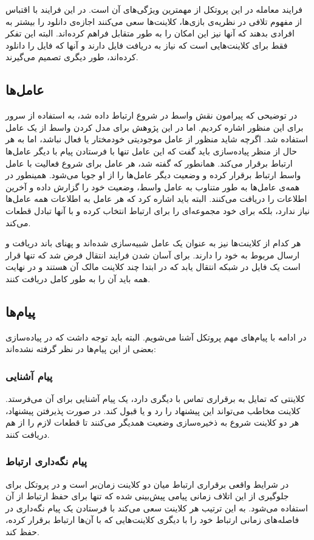 \documentclass{article}
\begin{document}
فرایند معامله در این پروتکل از مهمترین ویژگی‌های آن است. در این فرایند با اقتباس از مفهوم تلافی در نظریه‌ی بازی‌ها، کلاینت‌ها سعی می‌کنند اجازه‌ی دانلود را بیشتر به افرادی بدهند که آنها نیز این امکان را به طور متقابل فراهم کرده‌اند. البته این تفکر فقط برای کلاینت‌هایی است که نیاز به دریافت فایل دارند و آنها که فایل را دانلود کرده‌اند، طور دیگری تصمیم می‌گیرند.

\subsection{عامل‌ها}
در توضیحی که پیرامون نقش واسط در شروع ارتباط داده شد، به استفاده از سرور برای این منظور اشاره کردیم. اما در این پژوهش برای مدل کردن واسط از یک عامل استفاده شد. اگرچه شاید منظور از عامل موجودیتی خودمختار یا فعال نباشد، اما به هر حال از منظر پیاده‌سازی باید گفت که این عامل تنها با فرستادن پیام با دیگر عامل‌ها ارتباط برقرار می‌کند. همانطور که گفته شد، هر عامل برای شروع فعالیت با عامل واسط ارتباط برقرار کرده و وضعیت دیگر عامل‌ها را از او جویا می‌شود. همینطور در همه‌ی عامل‌ها به طور متناوب به عامل واسط، وضعیت خود را گزارش داده و آخرین اطلاعات را دریافت می‌کنند. البته باید اشاره کرد که هر عامل به اطلاعات همه عامل‌ها نیاز ندارد، بلکه برای خود مجموعه‌ای را برای ارتباط انتخاب کرده و با آنها تبادل قطعات می‌کند.

هر کدام از کلاینت‌ها نیز به عنوان یک عامل شبیه‌سازی شده‌اند و پهنای باند دریافت و ارسال مربوط به خود را دارند. برای آسان شدن فرایند انتقال فرض شد که تنها قرار است یک فایل در شبکه انتقال یابد که در ابتدا چند کلاینت مالک آن هستند و در نهایت همه باید آن را به طور کامل دریافت کنند.

\subsection{پیام‌ها}
در ادامه با پیام‌های مهم پروتکل آشنا می‌شویم. البته باید توجه داشت که در پیاده‌سازی بعضی از این پیام‌ها در نظر گرفته نشده‌اند:

\subsubsection{پیام آشنایی}
کلاینتی که تمایل به برقراری تماس با دیگری دارد، یک پیام آشنایی برای آن می‌فرستد. کلاینت مخاطب می‌تواند این پیشنهاد را رد و یا قبول کند. در صورت پذیرفتن پیشنهاد، هر دو کلاینت شروع به ذخیره‌سازی وضعیت همدیگر می‌کنند تا قطعات لازم را از هم دریافت کنند.

\subsubsection{پیام نگه‌داری ارتباط}
در شرایط واقعی برقراری ارتباط میان دو کلاینت زمان‌بر است و در  پروتکل برای جلوگیری از این اتلاف زمانی پیامی پیش‌بینی شده که تنها برای حفظ ارتباط از آن استفاده می‌شود. به این ترتیب هر کلاینت سعی می‌کند با فرستادن یک پیام نگه‌داری در فاصله‌های زمانی ارتباط خود را با دیگری کلاینت‌هایی که با آن‌ها ارتباط برقرار کرده، حفظ کند.
\end{document}
